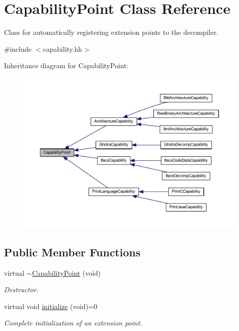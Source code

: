\hypertarget{class_capability_point}{}\section{Capability\+Point Class Reference}
\label{class_capability_point}


Class for automatically registering extension points to the decompiler.  




{\ttfamily \#include $<$capability.\+hh$>$}



Inheritance diagram for Capability\+Point\+:
\nopagebreak
\begin{figure}[H]
\begin{center}
\leavevmode
\includegraphics[width=350pt]{class_capability_point__inherit__graph}
\end{center}
\end{figure}
\subsection*{Public Member Functions}
\begin{DoxyCompactItemize}
\item 
virtual \mbox{\hyperlink{class_capability_point_aebccad5c6382839cdfc9113b8eff3f33}{$\sim$\+Capability\+Point}} (void)
\begin{DoxyCompactList}\small\item\em Destructor. \end{DoxyCompactList}\item 
virtual void \mbox{\hyperlink{class_capability_point_a493d24125e7e024a9b2d6c2ad4bfbfab}{initialize}} (void)=0
\begin{DoxyCompactList}\small\item\em Complete initialization of an extension point. \end{DoxyCompactList}\end{DoxyCompactItemize}
